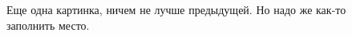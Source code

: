 \chapter{}
\label{cha:appendix2}


\begin{figure}
\centering
\caption{Еще одна картинка, ничем не лучше предыдущей. Но надо же как-то заполнить место.}
\end{figure}

